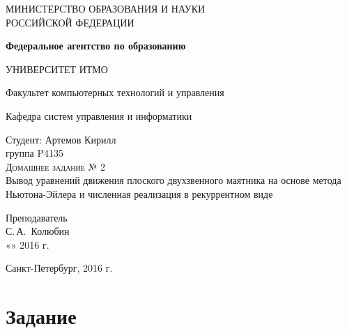 \documentclass[a4paper,14pt]{extreport}
\begin{document}
\renewcommand{\refname}{Литература}
\begin{titlepage}
	\begin{center}
		\large
		МИНИСТЕРСТВО ОБРАЗОВАНИЯ И НАУКИ\\ РОССИЙСКОЙ ФЕДЕРАЦИИ
		
		\textbf{Федеральное агентство по образованию}
		\vspace{0.5cm}
		
		УНИВЕРСИТЕТ ИТМО
		\vspace{0.25cm}
		
		Факультет компьютерных технологий и управления
		
		Кафедра систем управления и информатики
		\vfill
		
		
		Студент: Артемов Кирилл\\
		группа P4135\\
		
		\textsc{\LARGE Домашнее задание № 2}\\[5mm]
		
		{\LARGE Вывод уравнений движения плоского двухзвенного маятника на основе метода Ньютона-Эйлера и численная реализация в рекуррентном виде}	\bigskip
		
	\end{center}
	\vfill
	
	\newlength{\ML}
	\hfill\begin{minipage}{0.4\textwidth}
		Преподаватель\\
		\underline{\hspace{\ML}} С.\,А.~Колюбин\\
		«\underline{\hspace{0.7cm}}» \underline{\hspace{2cm}} 2016 г.
	\end{minipage}%
	\bigskip
	
	\vfill
	
	\begin{center}
		Санкт-Петербург, 2016 г.
	\end{center}
\end{titlepage}

\tableofcontents
\newpage

\section{Задание}
\end{document}
